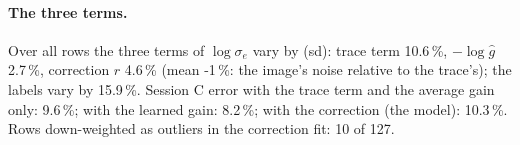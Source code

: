 \paragraph{The three terms.}
Over all rows the three terms of $\log\sigma_e$ vary by (sd): trace term 10.6\,\%, $-\log\hat g$ 2.7\,\%, correction $r$ 4.6\,\% (mean -1\,\%: the image's noise relative to the trace's); the labels vary by 15.9\,\%. Session C error with the trace term and the average gain only: 9.6\,\%; with the learned gain: 8.2\,\%; with the correction (the model): 10.3\,\%. Rows down-weighted as outliers in the correction fit: 10 of 127.
